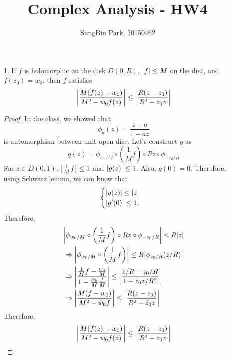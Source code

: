 \documentclass{article}
\begin{document}
\title{Complex Analysis - HW4}
\author{SungBin Park, 20150462} 

\maketitle
\begin{enumerate}
\item[1.] If $f$ is holomorphic on the disk $D(0, R)$, $\abs{f}\leq M$ on the disc, and $f(z_0)=w_0$, then $f$ satisfies
\begin{equation*}
\abs{\frac{M(f(z)-w_0)}{M^2-\bar{w}_0 f(z)}}\leq \abs{\frac{R(z-z_0)}{R^2-\bar{z}_0 z}}
\end{equation*}
\begin{proof}
In the class, we showed that
\begin{equation*}
\phi_a(z)=\frac{z-a}{1-\bar{a}z}
\end{equation*}
is automorphism between unit open disc.
Let's construct $g$ as
\begin{equation*}
g(z)=\phi_{w_0/M}\circ \left(\frac{1}{M}f\right)\circ Rz \circ \phi_{-z_0/R}
\end{equation*}
For $z\in D(0, 1)$, $\abs{\frac{1}{M}f}\leq 1$ and $\abs{g(z)}\leq 1$. Also, $g(0)=0$. Therefore, using Schwarz lemma, we can know that
\begin{equation*}
\begin{cases}
\abs{g(z)}\leq \abs{z} \\
\abs{g'(0)}\leq 1.
\end{cases}
\end{equation*}
Therefore,
\begin{equation*}
\begin{split}
&\abs{\phi_{w_0/M}\circ \left(\frac{1}{M}f\right)\circ Rz \circ \phi_{-z_0/R}}\leq R\abs{z} \\
&\Rightarrow \abs{\phi_{w_0/M}\circ \left(\frac{1}{M}f\right)}\leq R\abs{\phi_{z_0/R}(z/R)} \\
&\Rightarrow \abs{\frac{\frac{1}{M}f-\frac{w_0}{M}}{1-\frac{\bar{w}_0}{M}\frac{f}{M}}}\leq \abs{\frac{z/R-z_0/R}{1-\bar{z}_0z/R^2}}\\
&\Rightarrow \abs{\frac{M(f-w_0)}{M^2-\bar{w}_0f}}\leq \abs{\frac{R(z-z_0)}{R^2-\bar{z}_0z}}
\end{split}
\end{equation*} 
Therefore,
\begin{equation*}
\abs{\frac{M(f(z)-w_0)}{M^2-\bar{w}_0f(z)}}\leq \abs{\frac{R(z-z_0)}{R^2-\bar{z}_0 z}}
\end{equation*}
\end{proof}


\end{enumerate}
\end{document}
